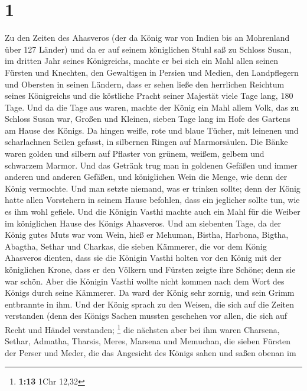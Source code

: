\hypertarget{section}{%
\section{1}\label{section}}

 Zu den Zeiten des Ahasveros (der da König war von Indien
bis an Mohrenland über 127 Länder)  und da er auf seinem
königlichen Stuhl saß zu Schloss Susan,  im dritten Jahr
seines Königreichs, machte er bei sich ein Mahl allen seinen Fürsten und
Knechten, den Gewaltigen in Persien und Medien, den Landpflegern und
Obersten in seinen Ländern,  dass er sehen ließe den
herrlichen Reichtum seines Königreichs und die köstliche Pracht seiner
Majestät viele Tage lang, 180 Tage.  Und da die Tage aus
waren, machte der König ein Mahl allem Volk, das zu Schloss Susan war,
Großen und Kleinen, sieben Tage lang im Hofe des Gartens am Hause des
Königs.  Da hingen weiße, rote und blaue Tücher, mit
leinenen und scharlachnen Seilen gefasst, in silbernen Ringen auf
Marmorsäulen. Die Bänke waren golden und silbern auf Pflaster von
grünem, weißem, gelbem und schwarzem Marmor.  Und das
Getränk trug man in goldenen Gefäßen und immer anderen und anderen
Gefäßen, und königlichen Wein die Menge, wie denn der König vermochte.
 Und man setzte niemand, was er trinken sollte; denn der
König hatte allen Vorstehern in seinem Hause befohlen, dass ein
jeglicher sollte tun, wie es ihm wohl gefiele.  Und die
Königin Vasthi machte auch ein Mahl für die Weiber im königlichen Hause
des Königs Ahasveros.  Und am siebenten Tage, da der König
gutes Muts war vom Wein, hieß er Mehuman, Bistha, Harbona, Bigtha,
Abagtha, Sethar und Charkas, die sieben Kämmerer, die vor dem König
Ahasveros dienten,  dass sie die Königin Vasthi holten vor
den König mit der königlichen Krone, dass er den Völkern und Fürsten
zeigte ihre Schöne; denn sie war schön.  Aber die Königin
Vasthi wollte nicht kommen nach dem Wort des Königs durch seine
Kämmerer. Da ward der König sehr zornig, und sein Grimm entbrannte in
ihm.  Und der König sprach zu den Weisen, die sich auf die
Zeiten verstanden (denn des Königs Sachen mussten geschehen vor allen,
die sich auf Recht und Händel verstanden; \footnote{\textbf{1:13} 1Chr
  12,32}  die nächsten aber bei ihm waren Charsena, Sethar,
Admatha, Tharsis, Meres, Marsena und Memuchan, die sieben Fürsten der
Perser und Meder, die das Angesicht des Königs sahen und saßen obenan im
